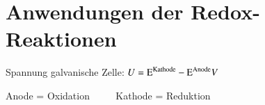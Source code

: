 \section{Anwendungen der Redox-Reaktionen}
   Spannung galvanische Zelle: $U = \ce{E^{Kathode}} - \ce{E^{Anode}} V$

   Anode = Oxidation $\qquad$ Kathode = Reduktion
